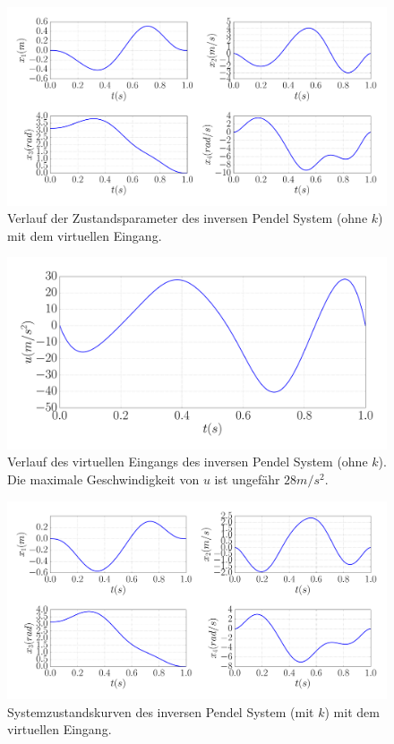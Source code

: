 \begin{beispiel}
	\begin{figure}
		\centering
		\includegraphics[width=0.8\linewidth]{bild/30_32/example0_ohne_k_x.pdf}%
		\caption{Verlauf der Zustandsparameter des inversen Pendel System (ohne $k$) mit dem virtuellen Eingang.}
		\label{fig:Inverses_Pendel_ohne_k_x}
	\end{figure}

	\begin{figure}[!h]
		\centering
		\includegraphics[width=0.7\linewidth]{bild/30_32/example0_ohne_k_u.pdf}%
		\caption[Verlauf des virtuellen Eingangs des inversen Pendel System (ohne $k$).]{Verlauf des virtuellen Eingangs des inversen Pendel System (ohne $k$). Die maximale Geschwindigkeit von $u$ ist ungefähr $28m/s^{2}$.}
		\label{fig:Inverses_Pendel_ohne_k_u}
	\end{figure}

	\begin{figure}[!h]
		\centering
		\includegraphics[width=0.8\linewidth]{bild/30_32/example0_mit_k_x_ori.pdf}%
		\caption{Systemzustandskurven des inversen Pendel System (mit $k$) mit dem virtuellen Eingang.}
		\label{fig:Inverses_Pendel_mit_k_x_ori}
	\end{figure}
	

\end{beispiel}
